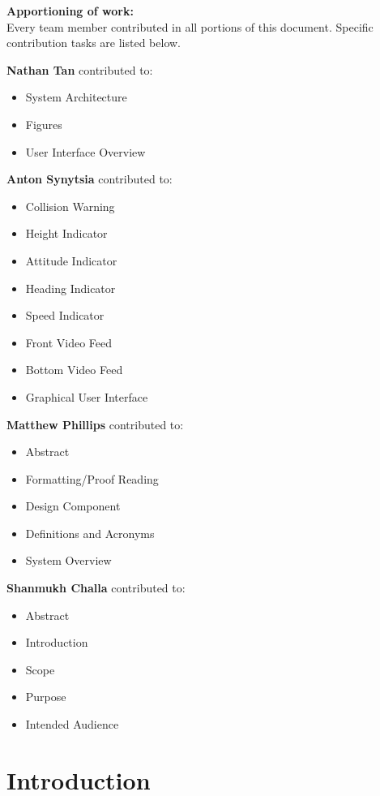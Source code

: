 \documentclass[onecolumn, oneside, letterpaper, draftclsnofoot, 10pt, compsoc]{IEEEtran}
\begin{document}
\noindent\textbf{Apportioning of work:}\\
\noindent Every team member contributed in all portions of this document. Specific contribution tasks are listed below.

\noindent\textbf{Nathan Tan} contributed to:
\begin{itemize}
    \item System Architecture
    \item Figures
    \item User Interface Overview
\end{itemize}

\noindent\textbf{Anton Synytsia} contributed to:
\begin{itemize}
    \item Collision Warning
    \item Height Indicator
    \item Attitude Indicator
    \item Heading Indicator
    \item Speed Indicator
    \item Front Video Feed
    \item Bottom Video Feed
    \item Graphical User Interface
\end{itemize}

\noindent\textbf{Matthew Phillips} contributed to:
\begin{itemize}
    \item Abstract
    \item Formatting/Proof Reading
    \item Design Component
    \item Definitions and Acronyms
    \item System Overview
\end{itemize}

\noindent\textbf{Shanmukh Challa} contributed to:
\begin{itemize}
    \item Abstract
    \item Introduction
    \item Scope
    \item Purpose
    \item Intended Audience
\end{itemize}

\newpage
\section{Introduction}
\end{document}
